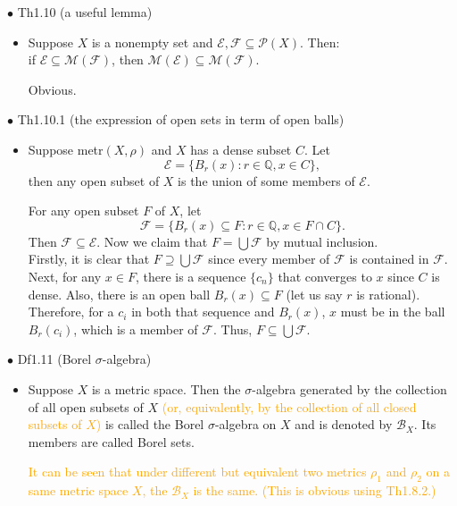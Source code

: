 \documentclass{article}
\begin{document}
{\Large $\bullet $ Th1.10 (a useful lemma)}\par
\begin{itemize}
    \item[]
    {\large Suppose $X$ is a nonempty set and $\mathcal{E} ,\mathcal{F} \subseteq \mathcal{P}(X)$. Then:\\
    if $\mathcal{E} \subseteq \mathcal{M}(\mathcal{F}) $, 
    then $\mathcal{M} (\mathcal{E}) \subseteq \mathcal{M}(\mathcal{F}) $.}\par
    {\textcolor{pf}{Obvious.}}
\end{itemize}\par
\quad

{\Large $\bullet $ Th1.10.1 (the expression of open sets in term of open balls)}\par
\begin{itemize}
    \item[]
    {\large Suppose metr$(X,\rho)$ and $X$ has a dense subset $C$. Let
    $$\mathcal{E}=\{B_r(x):r\in\mathbb{Q}, x\in C\},$$
    then any open subset of $X$ is the union of some members of $\mathcal{E}$.}\par
    {\textcolor{pf}{For any open subset $F$ of $X$, let 
    $$\mathcal{F}=\{B_r(x)\subseteq F:r\in\mathbb{Q}, x\in F\cap C\}.$$ Then $\mathcal{F}\subseteq\mathcal{E}$.
    Now we claim that $F=\bigcup\mathcal{F}$ by mutual inclusion.\\
    Firstly, it is clear that $F\supseteq\bigcup\mathcal{F}$ 
    since every member of $\mathcal{F}$ is contained in $\mathcal{F}$.\\
    Next, for any $x\in F$, there is a sequence $\{c_n\}$ that converges to $x$ since $C$ is dense.
    Also, there is an open ball $B_r(x)\subseteq F$ (let us say $r$ is rational). Therefore, for a $c_i$ in 
    both that sequence and $B_r(x)$, $x$ must be in the ball $B_r(c_i)$, which is a member of $\mathcal{F}$.
    Thus, $F\subseteq\bigcup\mathcal{F}$.}}
\end{itemize}\par
\quad

{\Large $\bullet $ Df1.11 (Borel $\sigma$-algebra)}\par
\begin{itemize}
    \item[]
    {\large Suppose $X$ is a metric space. 
    Then the $\sigma$-algebra generated by the collection of all open subsets of $X$ 
    \textcolor{orange}{(or, equivalently, by the collection of all closed subsets of $X$)} 
    is called the Borel $\sigma$-algebra on $X$ and is denoted by $\mathcal{B}_X$. 
    Its members are called Borel sets.}\par
    {\textcolor{orange}{It can be seen that under different but equivalent two metrics 
    $\rho_1$ and $\rho_2$ on a same metric space $X$, the $\mathcal{B}_X$ is the same. (This
    is obvious using Th1.8.2.)}}
\end{itemize}\par
\quad
\end{document}
